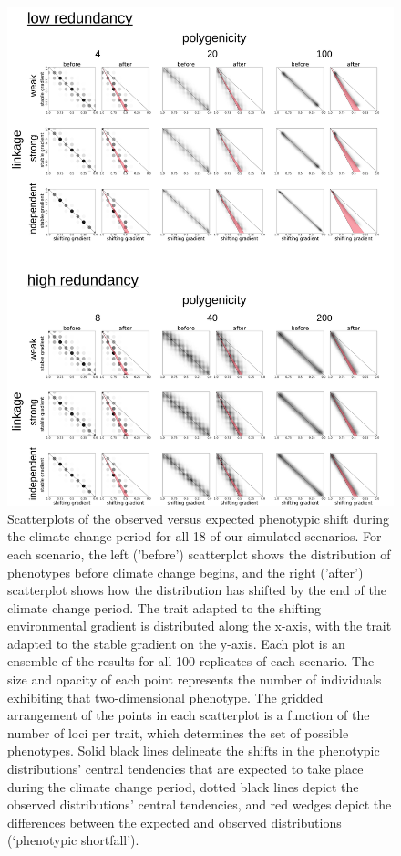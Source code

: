 \documentclass[9pt,twocolumn,twoside,lineno]{new_article}
\begin{document}
\begin{figure}
\centering
\includegraphics[width=15.8cm]{pub/figs_and_stats/FIG_4_phenotypic_shift.png}
\caption{Scatterplots of the observed versus expected phenotypic shift during the climate change period for all 18 of our simulated scenarios. For each scenario, the left ('before') scatterplot shows the distribution of phenotypes before climate change begins, and the right ('after') scatterplot shows how the distribution has shifted by the end of the climate change period. The trait adapted to the shifting environmental gradient is distributed along the x-axis, with the trait adapted to the stable gradient on the y-axis. Each plot is an ensemble of the results for all 100 replicates of each scenario. The size and opacity of each point represents the number of individuals exhibiting that two-dimensional phenotype. The gridded arrangement of the points in each scatterplot is a function of the number of loci per trait, which determines the set of possible phenotypes. Solid black lines delineate the shifts in the phenotypic distributions’ central tendencies that are expected to take place during the climate change period, dotted black lines depict the observed distributions’ central tendencies, and red wedges depict the differences between the expected and observed distributions (‘phenotypic shortfall’).
}
\label{fig:fig_4}
\end{figure}
\end{document}
